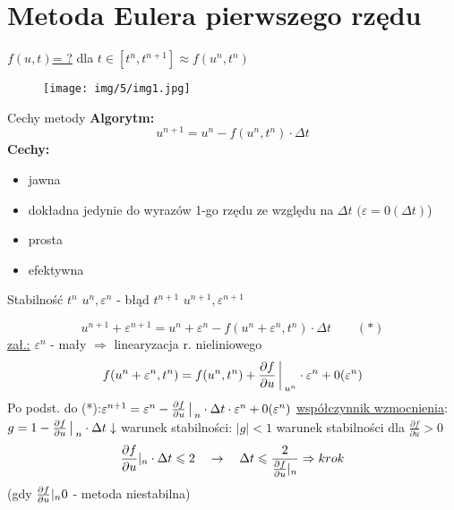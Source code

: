 \section{Metoda Eulera pierwszego rzędu}
\begin{frame}
  \underline{$f(u,t)$= ?} \quad dla  \quad $t \in [t^n,t^{n+1}] \approx f(u^n,t^n)$
  \begin{figure}
	\texttt{[image: img/5/img1.jpg]}
	\end{figure}
\end{frame}
\begin{frame}{Cechy metody}
  \textbf{Algorytm:}
  $$u^{n+1} = u^n - f(u^n, t^n) \cdot \Delta t$$
  \textbf{Cechy:}
  \begin{itemize}
    \item jawna
    \item dokładna jedynie do wyrazów 1-go rzędu ze względu na $\Delta t$ \quad $(\varepsilon=0(\Delta t)$)
    \item prosta
    \item efektywna
  \end{itemize}
\end{frame}
\begin{frame}{Stabilność}
  $t^n$ \quad $u^n, \varepsilon^n$ - błąd \qquad
  $t^{n+1}$ \quad $u^{n+1}, \varepsilon^{n+1}$ 

  $$u^{n+1} + \varepsilon^{n+1} = u^n+\varepsilon^n-f(u^n+\varepsilon^n,t^n)\cdot \Delta t \qquad(*)$$
  \underline{zał.:} $\varepsilon^n$ - mały $\Rightarrow$ linearyzacja r. nieliniowego
  $$f(u^n+\varepsilon^n,t^n) = f(u^n,t^n)+\frac{\partial f}{\partial u}{\bigg\arrowvert}_{u^n} \cdot \varepsilon^n+0(\varepsilon^n)$$
  Po podst. do (*):\qquad $\varepsilon^{n+1} = \varepsilon^n-\frac{\partial f}{\partial u}\big\arrowvert_n \cdot \Delta t \cdot \varepsilon^n +0(\varepsilon^n)$ \newline
  \underline{współczynnik wzmocnienia}:\qquad $g = 1- \frac{\partial f}{\partial u}{\big\arrowvert}_n \cdot \Delta t\downarrow$
  warunek stabilności: $|g|<1$ warunek stabilności dla $\frac{\partial f}{\partial u}>0$
  $$\frac{\partial f}{\partial u}\arrowvert_n \cdot \Delta t \leqslant 2 \quad 
  \rightarrow \quad \Delta t \leqslant \frac{2}{\frac{\partial f}{\partial u}\arrowvert_n} \Rightarrow krok$$
  (gdy $\frac{\partial f}{\partial u}\arrowvert_n 0$ - metoda niestabilna)
\end{frame}

